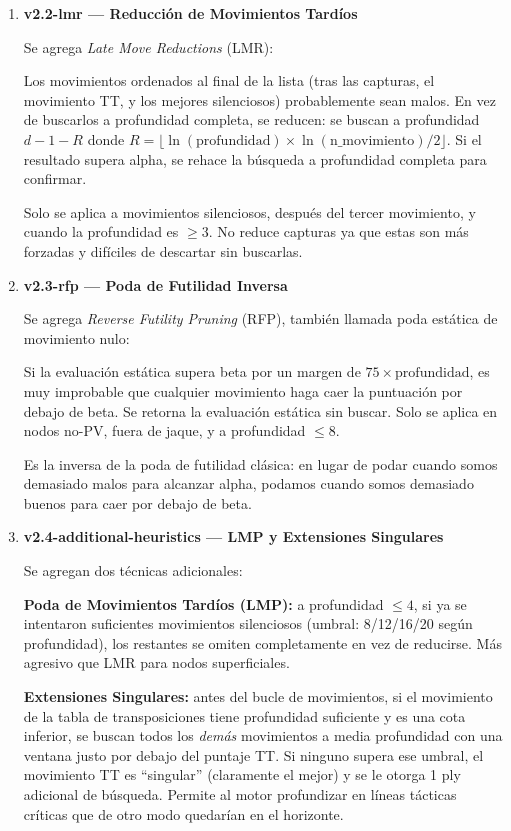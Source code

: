 \documentclass[12pt]{article}
\begin{document}
\begin{enumerate}[label=\textbf{\arabic*.}]
    \item \textbf{v2.2-lmr --- Reducción de Movimientos Tardíos}

    Se agrega \textit{Late Move Reductions} (LMR):

    Los movimientos ordenados al final de la lista (tras las capturas, el movimiento TT, y los mejores silenciosos) probablemente sean malos. En vez de buscarlos a profundidad completa, se reducen: se buscan a profundidad $d - 1 - R$ donde $R = \lfloor \ln(\text{profundidad}) \times \ln(\text{n\_movimiento}) / 2 \rfloor$. Si el resultado supera alpha, se rehace la búsqueda a profundidad completa para confirmar.

    Solo se aplica a movimientos silenciosos, después del tercer movimiento, y cuando la profundidad es $\geq 3$. No reduce capturas ya que estas son más forzadas y difíciles de descartar sin buscarlas.

    \item \textbf{v2.3-rfp --- Poda de Futilidad Inversa}

    Se agrega \textit{Reverse Futility Pruning} (RFP), también llamada poda estática de movimiento nulo:

    Si la evaluación estática supera beta por un margen de $75 \times \text{profundidad}$, es muy improbable que cualquier movimiento haga caer la puntuación por debajo de beta. Se retorna la evaluación estática sin buscar. Solo se aplica en nodos no-PV, fuera de jaque, y a profundidad $\leq 8$.

    Es la inversa de la poda de futilidad clásica: en lugar de podar cuando somos demasiado malos para alcanzar alpha, podamos cuando somos demasiado buenos para caer por debajo de beta.

    \item \textbf{v2.4-additional-heuristics --- LMP y Extensiones Singulares}

    Se agregan dos técnicas adicionales:

    \textbf{Poda de Movimientos Tardíos (LMP):} a profundidad $\leq 4$, si ya se intentaron suficientes movimientos silenciosos (umbral: 8/12/16/20 según profundidad), los restantes se omiten completamente en vez de reducirse. Más agresivo que LMR para nodos superficiales.

    \textbf{Extensiones Singulares:} antes del bucle de movimientos, si el movimiento de la tabla de transposiciones tiene profundidad suficiente y es una cota inferior, se buscan todos los \textit{demás} movimientos a media profundidad con una ventana justo por debajo del puntaje TT. Si ninguno supera ese umbral, el movimiento TT es ``singular'' (claramente el mejor) y se le otorga 1 ply adicional de búsqueda. Permite al motor profundizar en líneas tácticas críticas que de otro modo quedarían en el horizonte.

\end{enumerate}
\end{document}
